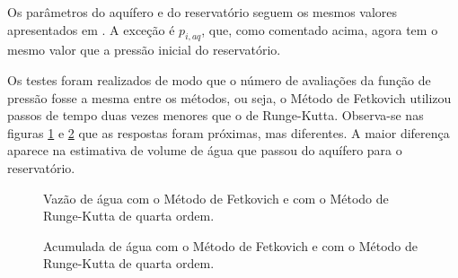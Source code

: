 \documentclass[final,5p]{elsarticle}
\numberwithin{equation}{section}
\begin{document}
        Os parâmetros do aquífero e do reservatório seguem os mesmos valores apresentados em \cite{relatorioeuler}. A exceção é $p_{i,aq}$, que, como comentado acima, agora tem o mesmo valor que a pressão inicial do reservatório.

        Os testes foram realizados de modo que o número de avaliações da função de pressão fosse a mesma entre os métodos, ou seja, o Método de Fetkovich utilizou passos de tempo duas vezes menores que o de Runge-Kutta. Observa-se nas figuras \ref{fig:aqqw} e \ref{fig:we} que as respostas foram próximas, mas diferentes. A maior diferença aparece na estimativa de volume de água que passou do aquífero para o reservatório.

        \begin{figure}[hbt!]
            \caption{Vazão de água com o Método de Fetkovich e com o Método de Runge-Kutta de quarta ordem.}
            \label{fig:aqqw}
        \end{figure}

        \begin{figure}[hbt!]
            \caption{Acumulada de água com o Método de Fetkovich e com o Método de Runge-Kutta de quarta ordem.}
            \label{fig:we}
        \end{figure}
\end{document}
